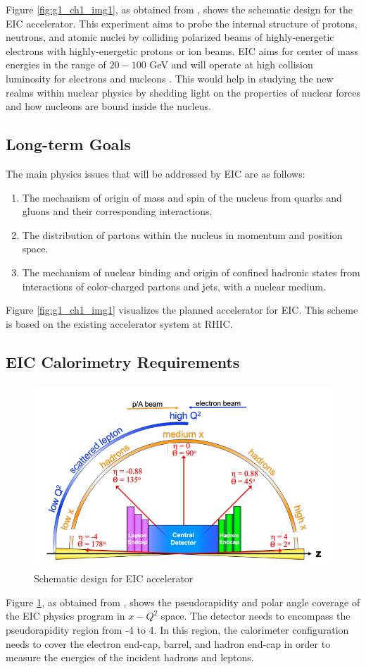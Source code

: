 Figure \ref{fig:g1_ch1_img1}, as obtained from \cite{yellowreport2021}, shows the schematic design for the EIC accelerator. This experiment aims to probe the internal structure of protons, neutrons, and atomic nuclei by colliding polarized beams of highly-energetic electrons with highly-energetic protons or ion beams. EIC aims for center of mass energies in the range of $20-100$ GeV and will operate at high collision luminosity for electrons and nucleons \cite{yellowreport2021}. This would help in studying the new realms within nuclear physics by shedding light on the properties of nuclear forces and how nucleons are bound inside the nucleus.

\subsection{Long-term Goals}

The main physics issues that will be addressed by EIC are as follows:
\begin{enumerate}
    \item The mechanism of origin of mass and spin of the nucleus from quarks and gluons and their corresponding interactions.
    \item The distribution of partons within the nucleus in momentum and position space.
    \item The mechanism of nuclear binding and origin of confined hadronic states from interactions of color-charged partons and jets, with a nuclear medium.
\end{enumerate}

Figure \ref{fig:g1_ch1_img1} visualizes the planned accelerator for EIC. This scheme is based on the existing accelerator system at RHIC.

\subsection{EIC Calorimetry Requirements}
\begin{figure}[H]
        \centering
		\includegraphics[width=0.5\linewidth]{group1/EIC_1.png}
		\caption{Schematic design for EIC accelerator}
		\label{fig:g1_ch1_img2}
\end{figure}
Figure \ref{fig:g1_ch1_img2}, as obtained from \cite{yellowreport2021}, shows the pseudorapidity and polar angle coverage of the EIC physics program in $x - Q^2$ space. The detector needs to encompass the pseudorapidity region from -4 to 4. In this region, the calorimeter configuration needs to cover the electron end-cap, barrel, and hadron end-cap in order to measure the energies of the incident hadrons and leptons.

